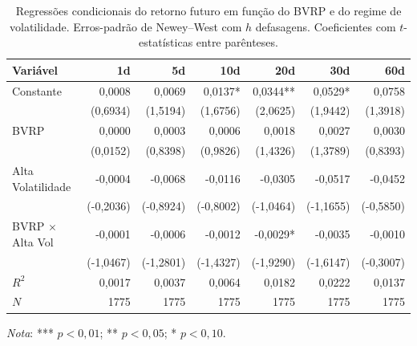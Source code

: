 \begin{table}[H]
\centering
\small
\caption{Regressões condicionais do retorno futuro em função do BVRP e do regime de volatilidade.
Erros-padrão de Newey--West com $h$ defasagens. Coeficientes com $t$-estatísticas entre parênteses.}
\label{tab:retnl-regressoes}
\begin{tabular}{lrrrrrr}
\toprule
Variável & 1d & 5d & 10d & 20d & 30d & 60d \\
\midrule
Constante & 0,0008 & 0,0069 & 0,0137* & 0,0344** & 0,0529* & 0,0758 \\
 & (0,6934) & (1,5194) & (1,6756) & (2,0625) & (1,9442) & (1,3918) \\
\addlinespace[2pt]
BVRP & 0,0000 & 0,0003 & 0,0006 & 0,0018 & 0,0027 & 0,0030 \\
 & (0,0152) & (0,8398) & (0,9826) & (1,4326) & (1,3789) & (0,8393) \\
\addlinespace[2pt]
Alta Volatilidade & -0,0004 & -0,0068 & -0,0116 & -0,0305 & -0,0517 & -0,0452 \\
 & (-0,2036) & (-0,8924) & (-0,8002) & (-1,0464) & (-1,1655) & (-0,5850) \\
\addlinespace[2pt]
BVRP $\times$ Alta Vol & -0,0001 & -0,0006 & -0,0012 & -0,0029* & -0,0035 & -0,0010 \\
 & (-1,0467) & (-1,2801) & (-1,4327) & (-1,9290) & (-1,6147) & (-0,3007) \\
\addlinespace[2pt]
\midrule
$R^2$ & 0,0017 & 0,0037 & 0,0064 & 0,0182 & 0,0222 & 0,0137 \\
$N$ & 1775 & 1775 & 1775 & 1775 & 1775 & 1775 \\
\bottomrule
\end{tabular}
\par\smallskip
\footnotesize\textit{Nota}: *** $p<0{,}01$; ** $p<0{,}05$; * $p<0{,}10$.
\end{table}